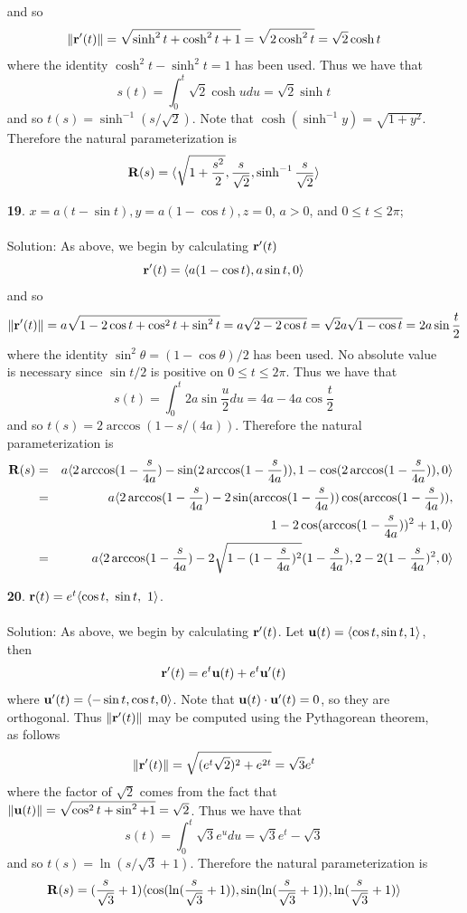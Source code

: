 \documentclass[12pt]{amsbook}
\newcommand{\la}{\langle}
\newcommand{\ra}{\rangle}
\begin{document}
\begin{enumerate}
  and so 
  $$\|{\bf r}'(t)\|=\sqrt{\sinh^2 t +\cosh^2 t +1} = \sqrt{2\cosh^2 t}=\sqrt{2}\cosh t$$
  where the identity $\cosh^2 t-\sinh^2 t=1$ has been used. 
  Thus we have that 
  $$s(t)=\int_0^t \sqrt{2}\cosh u du =\sqrt{2}\sinh t$$
  and so $t(s)=\sinh^{-1} (s/\sqrt{2})$. Note that $\cosh(\sinh^{-1} y)= \sqrt{1+y^2}$. Therefore the natural parameterization is
$${\bf R}(s)=\la \sqrt{1+\frac{s^2}{2}}, \frac{s}{\sqrt{2}}, \sinh^{-1}\frac{s}{\sqrt{2}} \ra$$
  \item[{\small\bf 19}.] $x=a(t-\sin t), y=a(1-\cos t), z=0$, $a>0$, and $0\leq t \leq 2\pi$; 
  \\
  \\
  {\sc Solution}: As above, we begin by calculating ${\bf r}'(t)$
  $${\bf r}'(t)=\la a(1-\cos t), a\sin t, 0 \ra$$
  and so 
  $$\|{\bf r}'(t)\|=a\sqrt{1-2\cos t +\cos^2 t +\sin^2 t} = a\sqrt{2-2\cos t}=\sqrt{2}a\sqrt{1-\cos t}=2a\sin \frac{t}{2}$$
  where the identity $\sin^2 \theta = (1-\cos \theta)/2$ has been used. No absolute value is necessary since $\sin t/2$ is positive on $0 \leq t \leq 2\pi$. 
  Thus we have that 
  $$s(t)=\int_0^t 2a\sin \frac{u}{2} du = 4a-4a\cos \frac{t}{2}$$
  and so $t(s)=2\arccos(1-s/(4a))$. Therefore the natural parameterization is
\begin{eqnarray*}
{\bf R}(s)&=&a \la 2\arccos(1-\frac{s}{4a}) -\sin(2\arccos(1-\frac{s}{4a})), 1-\cos(2\arccos(1-\frac{s}{4a})),0 \ra \\
&=&a \la 2\arccos(1-\frac{s}{4a}) -2\sin(\arccos(1-\frac{s}{4a}))\cos(\arccos(1-\frac{s}{4a})), \\
&& \ \ \  1-2\cos(\arccos(1-\frac{s}{4a}))^2+1,0 \ra \\
&=&a \la 2\arccos(1-\frac{s}{4a}) -2\sqrt{1-(1-\frac{s}{4a})^2}(1-\frac{s}{4a}), 2-2(1-\frac{s}{4a})^2,0 \ra \\
\end{eqnarray*}
  \item[{\small\bf 20}.] ${\bf r}(t)=e^t \la \cos t ,\ \sin t,\ 1 \ra$.
  \\
  \\
  {\sc Solution}: As above, we begin by calculating ${\bf r}'(t)$. Let ${\bf u}(t)=\la \cos t, \sin t, 1\ra$, then
  $${\bf r}'(t)=e^t{\bf u}(t)+e^t{\bf u}'(t)$$
  where ${\bf u}'(t)=\la -\sin t, \cos t, 0 \ra$. Note that ${\bf u}(t)\cdot {\bf u}'(t)=0$, so they are orthogonal. Thus $\|{\bf r}'(t)\|$ may be computed using the Pythagorean theorem, as follows 
  $$\|{\bf r}'(t)\|=\sqrt{(e^t\sqrt{2})^2+e^{2t}}=\sqrt{3}e^t$$
  where the factor of $\sqrt{2}$ comes from the fact that $\|{\bf u}(t)\|=\sqrt{\cos^2 t+\sin^2 +1}=\sqrt{2}$.
  Thus we have that 
  $$s(t)=\int_0^t \sqrt{3}e^u du = \sqrt{3}e^t-\sqrt{3}$$
  and so $t(s)=\ln(s/\sqrt{3}+1)$. Therefore the natural parameterization is
$${\bf R}(s)=(\frac{s}{\sqrt{3}}+1)\la \cos(\ln(\frac{s}{\sqrt{3}}+1)), \sin(\ln(\frac{s}{\sqrt{3}}+1)), \ln(\frac{s}{\sqrt{3}}+1) \ra$$
\end{enumerate}
\end{document}
